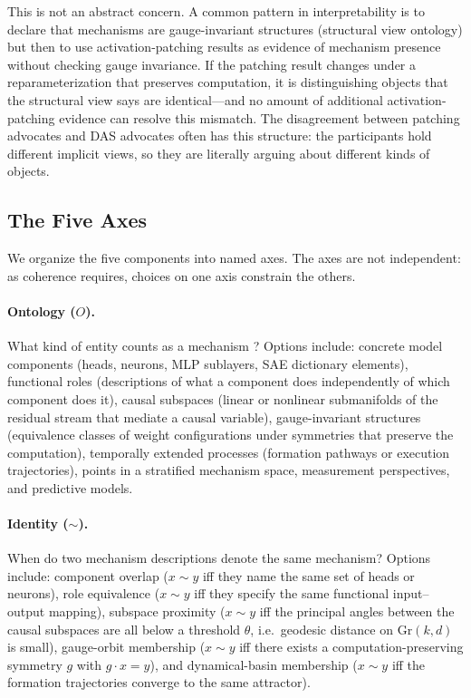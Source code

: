 \documentclass{article}
\newcommand{\Gr}{\mathrm{Gr}}
\begin{document}
This is not an abstract concern.  A common pattern in interpretability
is to declare that mechanisms are gauge-invariant structures (structural
view ontology) but then to use activation-patching results as evidence
of mechanism presence without checking gauge invariance.  If the
patching result changes under a reparameterization that preserves
computation, it is distinguishing objects that the structural view says
are identical---and no amount of additional activation-patching evidence
can resolve this mismatch.  The disagreement between patching advocates
and DAS advocates often has this structure: the participants hold
different implicit views, so they are literally arguing about different
kinds of objects.

\subsection{The Five Axes}\label{sec:axes}

We organize the five components into named axes.  The axes are not
independent: as coherence requires, choices on one axis constrain the
others.

\paragraph{Ontology ($O$).}
What kind of entity counts as a mechanism \citep{quine1948}?
Options include: concrete
model components (heads, neurons, MLP sublayers, SAE dictionary
elements), functional roles (descriptions of what a component does
independently of which component does it), causal subspaces (linear or
nonlinear submanifolds of the residual stream that mediate a causal
variable), gauge-invariant structures (equivalence classes of weight
configurations under symmetries that preserve the computation),
temporally extended processes (formation pathways or execution
trajectories), points in a stratified mechanism space, measurement
perspectives, and predictive models.

\paragraph{Identity ($\sim$).}
When do two mechanism descriptions denote the same mechanism?  Options
include: component overlap ($x \sim y$ iff they name the same set of
heads or neurons), role equivalence ($x \sim y$ iff they specify the
same functional input--output mapping), subspace proximity ($x \sim y$
iff the principal angles between the causal subspaces are all below a
threshold $\theta$, i.e.\ geodesic distance on $\Gr(k,d)$ is small),
gauge-orbit membership ($x \sim y$ iff there exists a computation-preserving
symmetry $g$ with $g \cdot x = y$), and dynamical-basin membership
($x \sim y$ iff the formation trajectories converge to the same
attractor).
\end{document}
